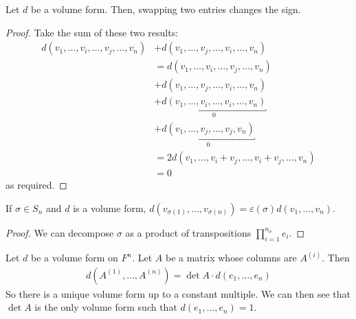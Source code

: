 \begin{lemma}
	Let $d$ be a volume form.
	Then, swapping two entries changes the sign.
\end{lemma}
\begin{proof}
	Take the sum of these two results:
	\begin{align*}
		d(v_1, \dots, v_i, \dots, v_j, \dots, v_n) & + d(v_1, \dots, v_j, \dots, v_i, \dots, v_n) \\
		& = d(v_1, \dots, v_i, \dots, v_j, \dots, v_n) \\
		& + d(v_1, \dots, v_j, \dots, v_i, \dots, v_n) \\
		& + \underbracket{d(v_1, \dots, v_i, \dots, v_i, \dots, v_n)}_0 \\
		& + \underbracket{d(v_1, \dots, v_j, \dots, v_j, v_n)}_0 \\
		& = 2 d(v_1, \dots, v_i + v_j, \dots, v_i + v_j, \dots, v_n) \\
		& = 0
	\end{align*}
	as required.
\end{proof}
\begin{corollary}
	If $\sigma \in S_n$ and $d$ is a volume form, $d(v_{\sigma(1)}, \dots, v_{\sigma(n)}) = \varepsilon(\sigma) d(v_1, \dots, v_n)$.
\end{corollary}
\begin{proof}
	We can decompose $\sigma$ as a product of transpositions $\prod_{i=1}^{n_\sigma} e_i$.
\end{proof}
\begin{theorem}
	Let $d$ be a volume form on $F^n$.
	Let $A$ be a matrix whose columns are $A^{(i)}$.
	Then
	\begin{align*}
		d(A^{(1)}, \dots, A^{(n)}) = \det A \cdot d(e_1, \dots, e_n)
	\end{align*}
	So there is a unique volume form up to a constant multiple.
	We can then see that $\det A$ is the only volume form such that $d(e_1, \dots, e_n) = 1$.
\end{theorem}
